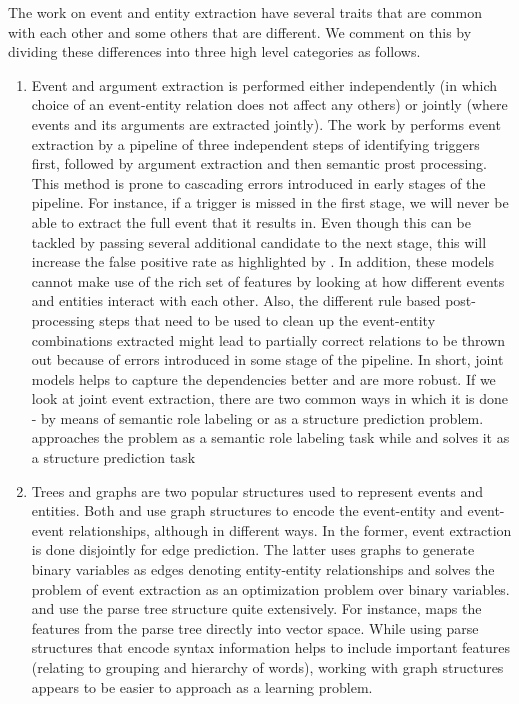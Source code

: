 
The work on event and entity extraction have several traits that are common with each other and some others that are different. We comment on this by dividing these differences into three high level categories as follows.
\begin{enumerate}
\item {} Event and argument extraction is performed either independently (in which choice of an event-entity relation does not affect any others) or jointly (where events and its arguments are extracted jointly). The work by \citeauthor{bjorne} performs event extraction by a pipeline of three independent steps of identifying triggers first, followed by argument extraction and then semantic prost processing. This method  is prone to cascading errors introduced in early stages of the pipeline. For instance, if a trigger is missed in the first stage, we will never be able to extract the full event that it results in. Even though this can be tackled by passing several additional candidate to the next stage, this will increase the false positive rate as highlighted by \cite{miwa2010c}. In addition, these models cannot make use of the rich set of features by looking at how different events and entities interact with each other. Also, the different rule based post-processing steps that need to be used to clean up the event-entity combinations extracted might lead to partially correct relations to be thrown out because of errors introduced in some stage of the pipeline. In short, joint models helps to capture the dependencies better and are more robust. If we look at joint event extraction, there are two common ways in which it is done - by means of semantic role labeling or as a structure prediction problem. \citeauthor{toutanova} approaches the problem as a semantic role labeling task while \citeauthor{bjorne} and \citeauthor{riedelmc} solves it as a structure prediction task

\item {} Trees and graphs are two popular structures used to represent events and entities. Both \citeauthor{bjorne} and \citeauthor{riedelmc} use graph structures to encode the event-entity and event-event relationships, although in different ways. In the former, event extraction is done disjointly for edge prediction. The latter uses graphs to generate binary variables as edges denoting entity-entity relationships and solves the problem of event extraction as an optimization problem over binary variables. \citeauthor{riedelmc} and \citeauthor{mcclosky} use the parse tree structure quite extensively. For instance, \citeauthor{riedelmc} maps the features from the parse tree directly into vector space. While using parse structures that encode syntax information helps to include important features (relating to grouping and hierarchy of words), working with graph structures appears to be easier to approach as a learning problem.


\end{enumerate}
